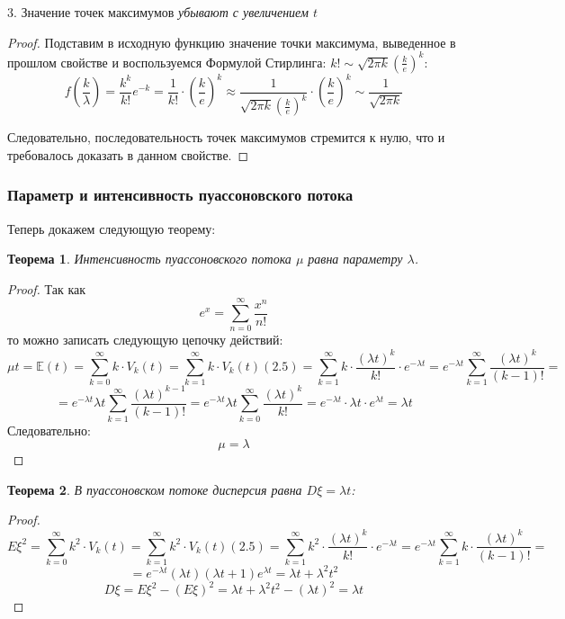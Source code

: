\documentclass[aps,%
12pt,%
final,%
oneside,
onecolumn,%
musixtex, %
superscriptaddress,%
centertags]{article} %
\theoremstyle{plain}
\newtheorem{theorem}{Теорема}[section] %
\theoremstyle{definition}
\theoremstyle{remark}
\begin{document}
3. Значение точек максимумов \textit{убывают с увеличением $t$}
\begin{proof}
	Подставим в исходную функцию значение точки максимума, выведенное в прошлом свойстве и воспользуемся Формулой Стирлинга: $k! \sim \sqrt{2\pi k} \left(\frac{k}{e}\right)^k$:
	$$f(\frac{k}{\lambda}) = \frac{k^k}{k!}e^{-k} = \frac{1}{k!}\cdot \left (\frac{k}{e} \right )^k \approx\frac{1}{\sqrt{2\pi k} \left(\frac{k}{e}\right)^k} \cdot \left (\frac{k}{e} \right )^k \sim \frac{1}{\sqrt {2\pi k}}$$

	Следовательно, последовательность точек максимумов стремится к нулю, что и требовалось доказать в данном свойстве.
\end{proof}

\subsubsection{Параметр и интенсивность пуассоновского потока}

Теперь докажем следующую теорему:
\begin{theorem}
	Интенсивность пуассоновского потока $\mu$ равна параметру $\lambda$.
\end{theorem}
\begin{proof}
	Так как 
	$$e^x = \sum\limits_{n=0}^{\infty} \frac{x^n}{n!}$$
	то можно записать следующую цепочку действий:
	$$\mu t = \mathbb{E}(t) =\sum_{k=0}^{\infty} k \cdot V_k(t) = \sum_{k=1}^{\infty} k \cdot V_k(t) (2.5) = \sum_{k=1}^{\infty} k \cdot \frac{(\lambda t)^k}{k!} \cdot e^{-\lambda t} =e^{-\lambda t}  \sum_{k=1}^{\infty} \frac{(\lambda t)^k}{(k-1)!} =$$
	$$=e^{-\lambda t} \lambda t \sum_{k=1}^{\infty} \frac{(\lambda t)^{k-1}}{(k-1)!} = e^{-\lambda t} \lambda t \sum_{k=0}^{\infty} \frac{(\lambda t)^{k}}{k!} =  e^{-\lambda t} \cdot \lambda t \cdot e^{\lambda t} = \lambda t$$
	Следовательно:
	$$\mu = \lambda$$
	
\end{proof}
\begin{theorem}
	В пуассоновском потоке дисперсия равна $D\xi = \lambda t$:
\end{theorem}
\begin{proof}
	$$E\xi^2 = \sum_{k=0}^{\infty} k^2 \cdot V_k(t) = \sum_{k=1}^{\infty} k^2 \cdot V_k(t) (2.5) = \sum_{k=1}^{\infty} k^2 \cdot \frac{(\lambda t)^k}{k!} \cdot e^{-\lambda t}=e^{-\lambda t}  \sum_{k=1}^{\infty} k \cdot \frac{(\lambda t)^k}{(k-1)!} =$$
	$$=e^{-\lambda t} (\lambda t)(\lambda t +1 ) e^{\lambda t} = \lambda t + \lambda^2 t^2$$
	$$ D \xi = E \xi^2 - (E \xi)^2 =\lambda t + \lambda^2 t^2 - (\lambda t)^2 =  \lambda t$$
\end{proof}
\end{document}
